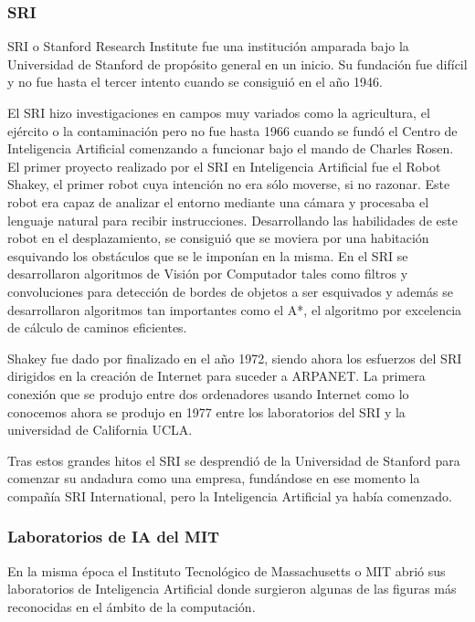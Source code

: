\subsubsection{SRI}
SRI o Stanford Research Institute fue una institución amparada bajo la Universidad de Stanford de propósito general en un inicio. Su fundación fue difícil y no fue hasta el tercer intento cuando se consiguió en el año 1946.

\vspace{10px}

El SRI hizo investigaciones en campos muy variados como la agricultura, el ejército o la contaminación pero no fue hasta 1966 cuando se fundó el Centro de Inteligencia Artificial comenzando a funcionar bajo el mando de Charles Rosen. El primer proyecto realizado por el SRI en Inteligencia Artificial fue el Robot Shakey, el primer robot cuya intención no era sólo moverse, si no razonar. Este robot era capaz de analizar el entorno mediante una cámara y procesaba el lenguaje natural para recibir instrucciones. Desarrollando las habilidades de este robot en el desplazamiento, se consiguió que se moviera por una habitación esquivando los obstáculos que se le imponían en la misma. En el SRI se desarrollaron algoritmos de Visión por Computador tales como filtros y convoluciones para detección de bordes de objetos a ser esquivados y además se desarrollaron algoritmos tan importantes como el A*, el algoritmo por excelencia de cálculo de caminos eficientes.

\vspace{10px}

Shakey fue dado por finalizado en el año 1972, siendo ahora los esfuerzos del SRI dirigidos en la creación de Internet para suceder a ARPANET. La primera conexión que se produjo entre dos ordenadores usando Internet como lo conocemos ahora se produjo en 1977 entre los laboratorios del SRI y la universidad de California UCLA.

\vspace{10px}

Tras estos grandes hitos el SRI se desprendió de la Universidad de Stanford para comenzar su andadura como una empresa, fundándose en ese momento la compañía SRI International, pero la Inteligencia Artificial ya había comenzado.

\subsubsection{Laboratorios de IA del MIT}
En la misma época el Instituto Tecnológico de Massachusetts o MIT abrió sus laboratorios de Inteligencia Artificial donde surgieron algunas de las figuras más reconocidas en el ámbito de la computación.


